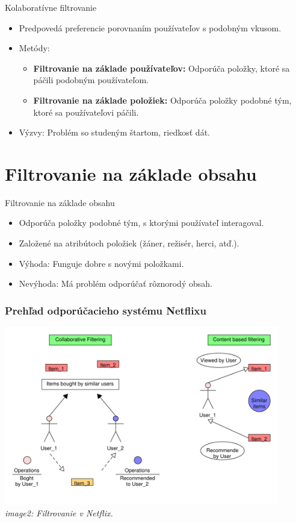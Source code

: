 \documentclass{beamer}
\begin{document}
\begin{frame}{Kolaboratívne filtrovanie}
    \begin{itemize}
        \item Predpovedá preferencie porovnaním používateľov s podobným vkusom.
        \item Metódy:
        \begin{itemize}
            \item \textbf{Filtrovanie na základe používateľov:} Odporúča položky, ktoré sa páčili podobným používateľom.
            \item \textbf{Filtrovanie na základe položiek:} Odporúča položky podobné tým, ktoré sa používateľovi páčili.
        \end{itemize}
        \item Výzvy: Problém so studeným štartom, riedkosť dát.
    \end{itemize}
\end{frame}

\section{Filtrovanie na základe obsahu}

\begin{frame}{Filtrovanie na základe obsahu}
    \begin{itemize}
        \item Odporúča položky podobné tým, s ktorými používateľ interagoval.
        \item Založené na atribútoch položiek (žáner, režisér, herci, atď.).
        \item Výhoda: Funguje dobre s novými položkami.
        \item Nevýhoda: Má problém odporúčať rôznorodý obsah.
    \end{itemize}
\end{frame}

\begin{frame}
    \frametitle{Prehľad odporúčacieho systému Netflixu}
    \centering
    \includegraphics[width=0.9\textwidth]{Images_tables/Filtering_pdf.pdf}
    \vspace{1em}
    \textit{image2: Filtrovanie v Netflix.}
\end{frame}
\end{document}
